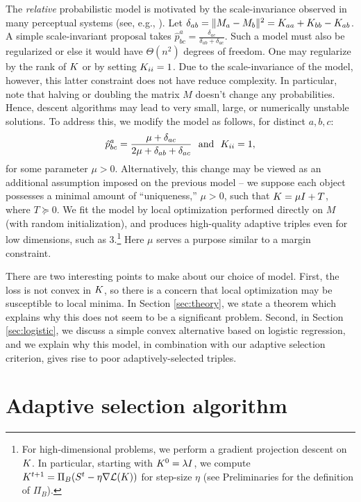 \documentclass{article}
\begin{document}
The {\em relative} probabilistic model is motivated by the scale-invariance observed in many perceptual systems (see, e.g., \citealp{CB99}).  Let $\delta_{ab} = \|M_a-M_b\|^2=\S_{aa}+\S_{bb}-\S_{ab}$.  A simple scale-invariant proposal takes $\hat{p}^a_{bc} = \frac{\delta_{ac}}{\delta_{ab}+\delta_{ac}}$.  Such a model must also be regularized or else it would have $\Theta(n^2)$ degrees of freedom.  One may regularize by the rank of $\S$ or by setting $\S_{ii}=1$.  Due to the scale-invariance of the model, however, this latter constraint does not have reduce complexity.  In particular, note that halving or doubling the matrix $M$ doesn't change any probabilities.  Hence, descent algorithms may lead to very small, large, or numerically unstable solutions.  To address this, we modify the model as follows, for distinct $a,b,c$:
\begin{equation}
\label{eq:rel}
\hat{p}^a_{bc} =  \frac{\mu+\delta_{ac}}{2\mu+\delta_{ab}+\delta_{ac}} \ \textrm{ and }\  \S_{ii}=1,
\end{equation}
for some parameter $\mu>0$.  Alternatively, this change may be viewed as an additional assumption imposed on the previous model --  we suppose each object possesses a minimal amount of ``uniqueness,'' $\mu>0$, such that $\S = \mu I + T$, where $T \succeq 0$.  We fit the model by local optimization performed directly on $M$ (with random initialization), and produces high-quality adaptive triples even for low dimensions, such as 3.\footnote{For high-dimensional problems, we perform a gradient projection descent on $\S$.  In particular, 
starting with $\S^0=\lambda I$, we compute $\S^{t+1}= \Pi_B(S^t - \eta \nabla \cL(\S))$ for step-size $\eta$ (see Preliminaries for the definition of $\Pi_B$).}  Here $\mu$ serves a purpose similar to a margin constraint.  

There are two interesting points to make about our choice of model.  First, the loss is not convex in $\S$, so there is a concern that local optimization may be susceptible to local minima.  In Section \ref{sec:theory}, we state a theorem which explains why this does not seem to be a significant problem.  Second, in Section \ref{sec:logistic}, we discuss a simple convex alternative based on logistic regression, and we explain why this model, in combination with our adaptive selection criterion, gives rise to poor adaptively-selected triples.


\section{Adaptive selection algorithm}\label{sec:ada}
\end{document}
